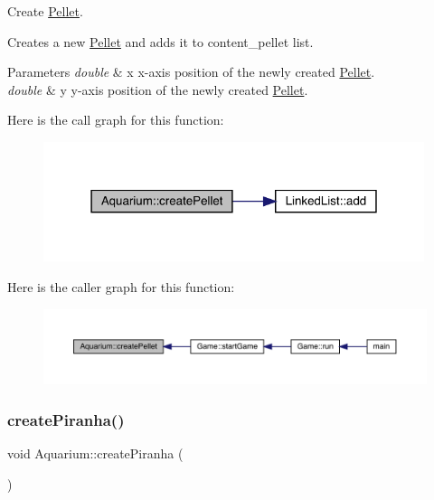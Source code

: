 Create \mbox{\hyperlink{class_pellet}{Pellet}}. 

Creates a new \mbox{\hyperlink{class_pellet}{Pellet}} and adds it to content\+\_\+pellet list. 
\begin{DoxyParams}{Parameters}
{\em double} & x x-\/axis position of the newly created \mbox{\hyperlink{class_pellet}{Pellet}}. \\
\hline
{\em double} & y y-\/axis position of the newly created \mbox{\hyperlink{class_pellet}{Pellet}}. \\
\hline
\end{DoxyParams}
Here is the call graph for this function\+:\nopagebreak
\begin{figure}[H]
\begin{center}
\leavevmode
\includegraphics[width=316pt]{class_aquarium_a049ffa77e7bbb68ac031a098c4e635e7_cgraph}
\end{center}
\end{figure}
Here is the caller graph for this function\+:\nopagebreak
\begin{figure}[H]
\begin{center}
\leavevmode
\includegraphics[width=350pt]{class_aquarium_a049ffa77e7bbb68ac031a098c4e635e7_icgraph}
\end{center}
\end{figure}
\mbox{\label{class_aquarium_a416b16bc7c252260b9cbe053a6e5a76c}} 
\subsubsection{\texorpdfstring{create\+Piranha()}{createPiranha()}}
{\footnotesize\ttfamily void Aquarium\+::create\+Piranha (\begin{DoxyParamCaption}{ }\end{DoxyParamCaption})}



